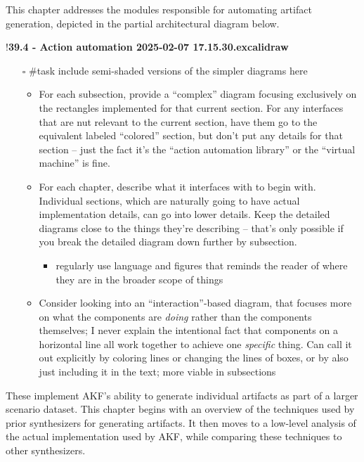 This chapter addresses the modules responsible for automating artifact
generation, depicted in the partial architectural diagram below.

!\textbf{39.4 - Action automation 2025-02-07 17.15.30.excalidraw}

\begin{itemize}
\tightlist
\item[$\square$]
  \#task include semi-shaded versions of the simpler diagrams here

  \begin{itemize}
  \tightlist
  \item
    For each subsection, provide a ``complex'' diagram focusing
    exclusively on the rectangles implemented for that current section.
    For any interfaces that are nut relevant to the current section,
    have them go to the equivalent labeled ``colored'' section, but
    don't put any details for that section -- just the fact it's the
    ``action automation library'' or the ``virtual machine'' is fine.
  \item
    For each chapter, describe what it interfaces with to begin with.
    Individual sections, which are naturally going to have actual
    implementation details, can go into lower details. Keep the detailed
    diagrams close to the things they're describing -- that's only
    possible if you break the detailed diagram down further by
    subsection.

    \begin{itemize}
    \tightlist
    \item
      regularly use language and figures that reminds the reader of
      where they are in the broader scope of things
    \end{itemize}
  \item
    Consider looking into an ``interaction''-based diagram, that focuses
    more on what the components are \emph{doing} rather than the
    components themselves; I never explain the intentional fact that
    components on a horizontal line all work together to achieve one
    \emph{specific} thing. Can call it out explicitly by coloring lines
    or changing the lines of boxes, or by also just including it in the
    text; more viable in subsections
  \end{itemize}
\end{itemize}

These implement AKF's ability to generate individual artifacts as part
of a larger scenario dataset. This chapter begins with an overview of
the techniques used by prior synthesizers for generating artifacts. It
then moves to a low-level analysis of the actual implementation used by
AKF, while comparing these techniques to other synthesizers.

